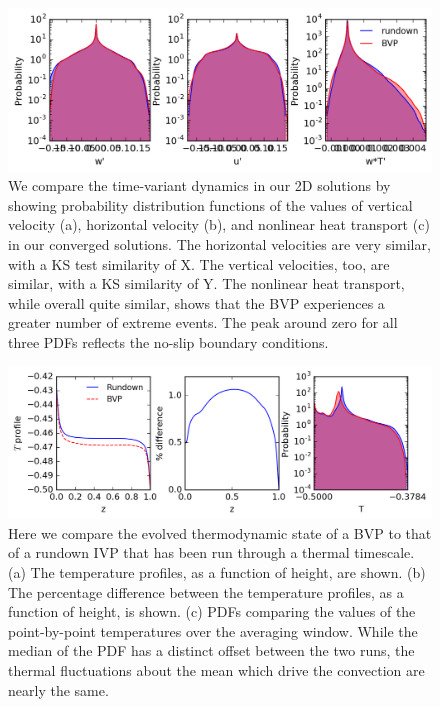 \documentclass[aps, pre, onecolumn, nofootinbib, notitlepage, groupedaddress, amsfonts, amssymb, amsmath, longbibliography]{revtex4-1}
\begin{document}
\begin{figure}[t]
\includegraphics[width=\textwidth]{./figs/pdf_comparison.png}
\caption{We compare the time-variant dynamics in our 2D solutions by showing probability distribution
functions of the values of vertical velocity (a), horizontal velocity (b), and nonlinear heat
transport (c) in our converged solutions.  The horizontal velocities are very similar, with a
KS test similarity of X.  The vertical velocities, too, are similar, with a KS similarity of
Y.  The nonlinear heat transport, while overall quite similar, shows that the BVP experiences
a greater number of extreme events.  The peak around zero for all three PDFs reflects the
no-slip boundary conditions.\label{fig:pdf_comparison} }
\end{figure}

\begin{figure}[t]
\includegraphics[width=\textwidth]{./figs/temp_comparison.png}
\caption{Here we compare the evolved thermodynamic state of a BVP to that of a rundown IVP that
has been run through a thermal timescale.  (a) The temperature profiles, as a function of height,
are shown. (b) The percentage difference between the temperature profiles, as a function of height,
is shown.  (c) PDFs comparing the values of the point-by-point temperatures over the averaging
window.  While the median of the PDF has a distinct offset between the two runs, the
thermal fluctuations about the mean which drive the convection are nearly the same.
\label{fig:temp_comparison} }
\end{figure}
\end{document}
